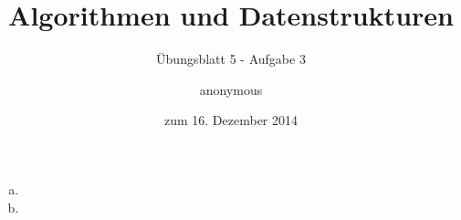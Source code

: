 \documentclass[a4paper]{scrartcl}
\title{Algorithmen und Datenstrukturen}
\subtitle{Übungsblatt 5 - Aufgabe 3}
\author{
    anonymous
}
\date{zum 16. Dezember 2014}
\begin{document}
\maketitle

\begin{enumerate}[(a)]
    \item

    \item

\end{enumerate}
\end{document}
